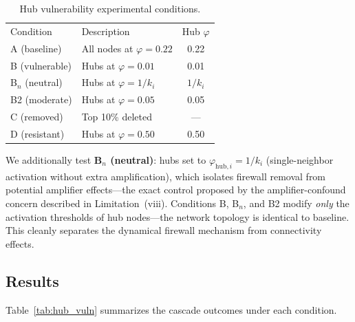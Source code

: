 \documentclass[aps,pre,twocolumn,superscriptaddress,showpacs]{revtex4-2}
\begin{document}
\begin{table}[h]
\caption{Hub vulnerability experimental conditions.}
\label{tab:conditions}
\begin{ruledtabular}
\begin{tabular}{llc}
\textrm{Condition} & \textrm{Description} & \multicolumn{1}{c}{\textrm{Hub } $\varphi$} \\
\colrule
A (baseline) & All nodes at $\varphi=0.22$ & 0.22 \\
B (vulnerable) & Hubs at $\varphi=0.01$ & 0.01 \\
B$_n$ (neutral) & Hubs at $\varphi=1/k_i$ & $1/k_i$ \\
B2 (moderate) & Hubs at $\varphi=0.05$ & 0.05 \\
C (removed) & Top 10\% deleted & \multicolumn{1}{c}{---} \\
D (resistant) & Hubs at $\varphi=0.50$ & 0.50 \\
\end{tabular}
\end{ruledtabular}
\end{table}

We additionally test \textbf{B$_n$ (neutral)}: hubs set to $\varphi_{\mathrm{hub},i} = 1/k_i$ (single-neighbor activation without extra amplification), which isolates firewall removal from potential amplifier effects---the exact control proposed by the amplifier-confound concern described in Limitation~(viii). Conditions B, B$_n$, and B2 modify \emph{only} the activation thresholds of hub nodes---the network topology is identical to baseline. This cleanly separates the dynamical firewall mechanism from connectivity effects.

\subsection{Results}

Table~\ref{tab:hub_vuln} summarizes the cascade outcomes under each condition.
\end{document}
